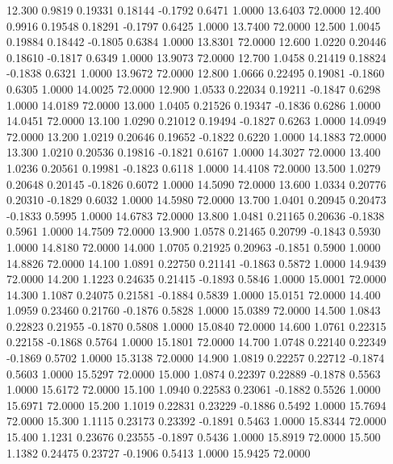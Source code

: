   12.300   0.9819   0.19331   0.18144  -0.1792   0.6471   1.0000  13.6403  72.0000
  12.400   0.9916   0.19548   0.18291  -0.1797   0.6425   1.0000  13.7400  72.0000
  12.500   1.0045   0.19884   0.18442  -0.1805   0.6384   1.0000  13.8301  72.0000
  12.600   1.0220   0.20446   0.18610  -0.1817   0.6349   1.0000  13.9073  72.0000
  12.700   1.0458   0.21419   0.18824  -0.1838   0.6321   1.0000  13.9672  72.0000
  12.800   1.0666   0.22495   0.19081  -0.1860   0.6305   1.0000  14.0025  72.0000
  12.900   1.0533   0.22034   0.19211  -0.1847   0.6298   1.0000  14.0189  72.0000
  13.000   1.0405   0.21526   0.19347  -0.1836   0.6286   1.0000  14.0451  72.0000
  13.100   1.0290   0.21012   0.19494  -0.1827   0.6263   1.0000  14.0949  72.0000
  13.200   1.0219   0.20646   0.19652  -0.1822   0.6220   1.0000  14.1883  72.0000
  13.300   1.0210   0.20536   0.19816  -0.1821   0.6167   1.0000  14.3027  72.0000
  13.400   1.0236   0.20561   0.19981  -0.1823   0.6118   1.0000  14.4108  72.0000
  13.500   1.0279   0.20648   0.20145  -0.1826   0.6072   1.0000  14.5090  72.0000
  13.600   1.0334   0.20776   0.20310  -0.1829   0.6032   1.0000  14.5980  72.0000
  13.700   1.0401   0.20945   0.20473  -0.1833   0.5995   1.0000  14.6783  72.0000
  13.800   1.0481   0.21165   0.20636  -0.1838   0.5961   1.0000  14.7509  72.0000
  13.900   1.0578   0.21465   0.20799  -0.1843   0.5930   1.0000  14.8180  72.0000
  14.000   1.0705   0.21925   0.20963  -0.1851   0.5900   1.0000  14.8826  72.0000
  14.100   1.0891   0.22750   0.21141  -0.1863   0.5872   1.0000  14.9439  72.0000
  14.200   1.1223   0.24635   0.21415  -0.1893   0.5846   1.0000  15.0001  72.0000
  14.300   1.1087   0.24075   0.21581  -0.1884   0.5839   1.0000  15.0151  72.0000
  14.400   1.0959   0.23460   0.21760  -0.1876   0.5828   1.0000  15.0389  72.0000
  14.500   1.0843   0.22823   0.21955  -0.1870   0.5808   1.0000  15.0840  72.0000
  14.600   1.0761   0.22315   0.22158  -0.1868   0.5764   1.0000  15.1801  72.0000
  14.700   1.0748   0.22140   0.22349  -0.1869   0.5702   1.0000  15.3138  72.0000
  14.900   1.0819   0.22257   0.22712  -0.1874   0.5603   1.0000  15.5297  72.0000
  15.000   1.0874   0.22397   0.22889  -0.1878   0.5563   1.0000  15.6172  72.0000
  15.100   1.0940   0.22583   0.23061  -0.1882   0.5526   1.0000  15.6971  72.0000
  15.200   1.1019   0.22831   0.23229  -0.1886   0.5492   1.0000  15.7694  72.0000
  15.300   1.1115   0.23173   0.23392  -0.1891   0.5463   1.0000  15.8344  72.0000
  15.400   1.1231   0.23676   0.23555  -0.1897   0.5436   1.0000  15.8919  72.0000
  15.500   1.1382   0.24475   0.23727  -0.1906   0.5413   1.0000  15.9425  72.0000

